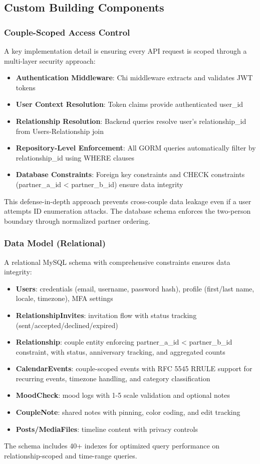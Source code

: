 \documentclass[sigconf, authorversion, nonacm, margin=0.75in]{acmart}
\begin{document}
\subsection{Custom Building Components}

\subsubsection{Couple-Scoped Access Control}
A key implementation detail is ensuring every API request is scoped through a multi-layer security approach:
\begin{itemize}
    \item \textbf{Authentication Middleware}: Chi middleware extracts and validates JWT tokens
    \item \textbf{User Context Resolution}: Token claims provide authenticated user\_id
    \item \textbf{Relationship Resolution}: Backend queries resolve user's relationship\_id from Users-Relationship join
    \item \textbf{Repository-Level Enforcement}: All GORM queries automatically filter by relationship\_id using WHERE clauses
    \item \textbf{Database Constraints}: Foreign key constraints and CHECK constraints (partner\_a\_id < partner\_b\_id) ensure data integrity
\end{itemize}
This defense-in-depth approach prevents cross-couple data leakage even if a user attempts ID enumeration attacks. The database schema enforces the two-person boundary through normalized partner ordering.

\subsubsection{Data Model (Relational)}
A relational MySQL schema with comprehensive constraints ensures data integrity:
\begin{itemize}
    \item \textbf{Users}: credentials (email, username, password hash), profile (first/last name, locale, timezone), MFA settings
    \item \textbf{RelationshipInvites}: invitation flow with status tracking (sent/accepted/declined/expired)
    \item \textbf{Relationship}: couple entity enforcing partner\_a\_id < partner\_b\_id constraint, with status, anniversary tracking, and aggregated counts
    \item \textbf{CalendarEvents}: couple-scoped events with RFC 5545 RRULE support for recurring events, timezone handling, and category classification
    \item \textbf{MoodCheck}: mood logs with 1-5 scale validation and optional notes
    \item \textbf{CoupleNote}: shared notes with pinning, color coding, and edit tracking
    \item \textbf{Posts/MediaFiles}: timeline content with privacy controls
\end{itemize}
The schema includes 40+ indexes for optimized query performance on relationship-scoped and time-range queries.
\end{document}
